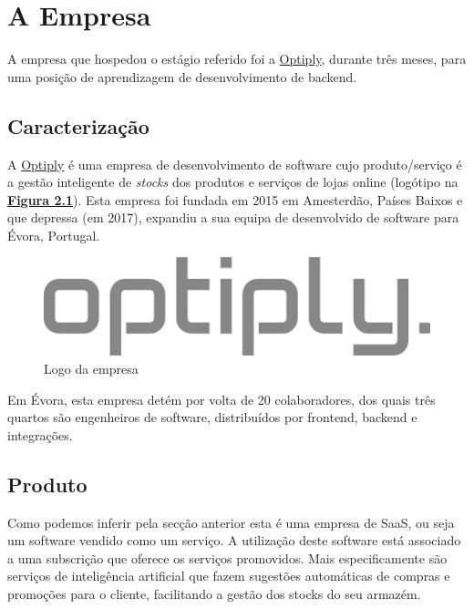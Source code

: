 \chapter{A Empresa}\label{cap2}

A empresa que hospedou o estágio referido foi a \href{https://optiply.nl/}{Optiply}, durante três meses, para uma posição de aprendizagem de desenvolvimento de backend.

\section{Caracterização}

A \href{https://optiply.nl/}{Optiply} é uma empresa de desenvolvimento de software cujo produto/serviço é a gestão inteligente de \textit{stocks} dos produtos e serviços de lojas online\cite{optiply} (logótipo na \hyperref[fig:logo]{\textbf{Figura 2.1}}). Esta empresa foi fundada em 2015 em Amesterdão, Países Baixos e que depressa (em 2017), expandiu a sua equipa de desenvolvido de software para Évora, Portugal.

\begin{figure}[!hbt]
  \centering
  \includegraphics[width=12cm]{figuras/optiply_logo.jpg}
  \caption{Logo da empresa}
  \label{fig:logo}
\end{figure}
\FloatBarrier

Em Évora, esta empresa detém por volta de 20 colaboradores, dos quais três quartos são engenheiros de software, distribuídos por frontend, backend e integrações.

\section{Produto}

Como podemos inferir pela secção anterior esta é uma empresa de SaaS, ou seja um software vendido como um serviço. A utilização deste software está associado a uma subscrição que oferece os serviços promovidos. Mais especificamente são serviços de inteligência artificial que fazem sugestões automáticas de compras e promoções para o cliente, facilitando a gestão dos stocks do seu armazém.

